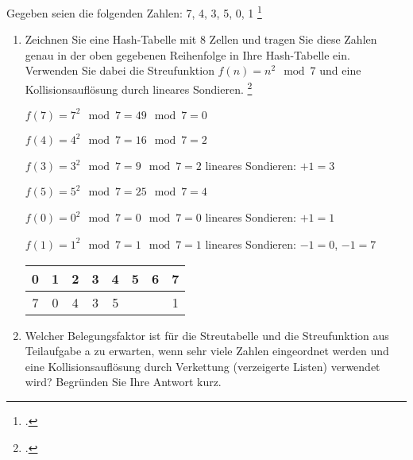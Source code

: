 \documentclass{bschlangaul-aufgabe}
\begin{document}

Gegeben seien die folgenden Zahlen: 7, 4, 3, 5, 0, 1
\footcite[Seite 2, Aufgabe 3]{aud:pu:5}

\begin{enumerate}


\item Zeichnen Sie eine Hash-Tabelle mit 8 Zellen und tragen Sie diese
Zahlen genau in der oben gegebenen Reihenfolge in Ihre Hash-Tabelle ein.
Verwenden Sie dabei die Streufunktion $f(n) = n^2 \mod 7$ und eine
Kollisionsauflösung durch lineares Sondieren.
\footcite{examen:66112:2005:03}

\begin{bAntwort}
{
\footnotesize
$f(7) = 7^2 \mod 7 = 49 \mod 7 = 0$

$f(4) = 4^2 \mod 7 = 16 \mod 7 = 2$

$f(3) = 3^2 \mod 7 = 9 \mod 7 = 2$ lineares Sondieren: $+1 = 3$

$f(5) = 5^2 \mod 7 = 25 \mod 7 = 4$

$f(0) = 0^2 \mod 7 = 0 \mod 7 = 0$ lineares Sondieren: $+1 = 1$

$f(1) = 1^2 \mod 7 = 1 \mod 7 = 1$ lineares Sondieren: $-1 = 0$, $-1 = 7$
}

\begin{tabular}{|c|c|c|c|c|c|c|c|}
\hline
0 & 1 & 2 & 3 & 4 & 5 & 6 & 7 \\\hline
7 & 0 & 4 & 3 & 5 &   &   & 1 \\\hline
\end{tabular}

\end{bAntwort}


\item Welcher Belegungsfaktor ist für die Streutabelle und die
Streufunktion aus Teilaufgabe a zu erwarten, wenn sehr viele Zahlen
eingeordnet werden und eine Kollisionsauflösung durch Verkettung
(verzeigerte Listen) verwendet wird? Begründen Sie Ihre Antwort kurz.


\end{enumerate}
\end{document}
